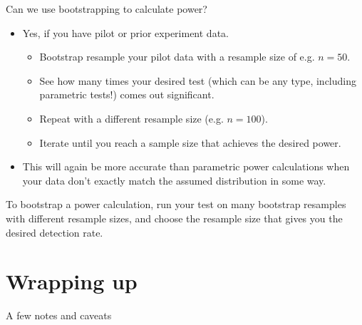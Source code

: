 \documentclass{beamer} %
\begin{document}
\begin{frame}{Can we use bootstrapping to calculate power?}
\begin{itemize}[<+(1)->]
\item Yes, if you have pilot or prior experiment data.
\begin{itemize}
    \item Bootstrap resample your pilot data with a resample size of e.g. $n=50$.
    \item See how many times your desired test (which can be any type, including parametric tests!) comes out significant.
    \item Repeat with a different resample size (e.g. $n=100$). 
    \item Iterate until you reach a sample size that achieves the desired power.
\end{itemize}
\item This will again be more accurate than parametric power calculations when your data don't exactly match the assumed distribution in some way.
\end{itemize}

\end{frame}

\begin{frame}[standout]
To bootstrap a power calculation, run your test on many bootstrap resamples with different resample sizes, and choose the resample size that gives you the desired detection rate.
\end{frame}


\section{Wrapping up}

\begin{frame}{A few notes and caveats}

\end{frame}
\end{document}
